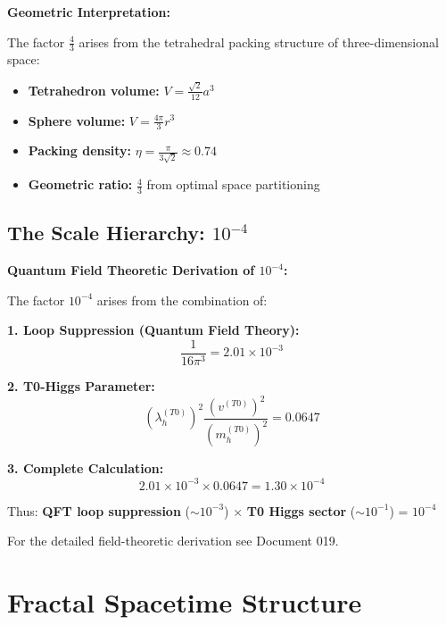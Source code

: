\documentclass[12pt,a4paper]{article}
\begin{document}
	\begin{alternative}
		\textbf{Geometric Interpretation:}
		
		The factor $\frac{4}{3}$ arises from the tetrahedral packing structure of three-dimensional space:
		\begin{itemize}
			\item \textbf{Tetrahedron volume:} $V = \frac{\sqrt{2}}{12}a^3$
			\item \textbf{Sphere volume:} $V = \frac{4\pi}{3}r^3$ 
			\item \textbf{Packing density:} $\eta = \frac{\pi}{3\sqrt{2}} \approx 0.74$
			\item \textbf{Geometric ratio:} $\frac{4}{3}$ from optimal space partitioning
		\end{itemize}
	\end{alternative}
	
	\subsection{The Scale Hierarchy: $10^{-4}$}
	
	\begin{foundation}
		\textbf{Quantum Field Theoretic Derivation of $10^{-4}$:}
		
		The factor $10^{-4}$ arises from the combination of:
		
		\textbf{1. Loop Suppression (Quantum Field Theory):}
		\begin{equation}
			\frac{1}{16\pi^3} = 2.01 \times 10^{-3}
		\end{equation}
		
		\textbf{2. T0-Higgs Parameter:}
		\begin{equation}
			(\lambda_h^{(T0)})^2 \frac{(v^{(T0)})^2}{(m_h^{(T0)})^2} = 0.0647
		\end{equation}
		
		\textbf{3. Complete Calculation:}
		\begin{equation}
			2.01 \times 10^{-3} \times 0.0647 = 1.30 \times 10^{-4}
		\end{equation}
		
		Thus: \textbf{QFT loop suppression} ($\sim 10^{-3}$) $\times$ \textbf{T0 Higgs sector} ($\sim 10^{-1}$) = $10^{-4}$
		
		For the detailed field-theoretic derivation see Document 019.
	\end{foundation}
	
	\section{Fractal Spacetime Structure}
	
\end{document}
